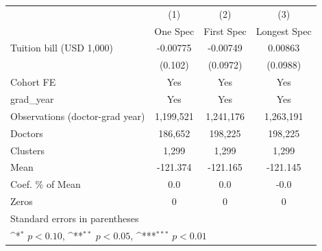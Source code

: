 {
\def\sym#1{\ifmmode^{#1}\else\(^{#1}\)\fi}
\begin{tabular}{l*{3}{c}}
\hline\hline
                    &\multicolumn{1}{c}{(1)}&\multicolumn{1}{c}{(2)}&\multicolumn{1}{c}{(3)}\\
                    &\multicolumn{1}{c}{One Spec}&\multicolumn{1}{c}{First Spec}&\multicolumn{1}{c}{Longest Spec}\\
\hline
Tuition bill (USD 1,000)&    -0.00775         &    -0.00749         &     0.00863         \\
                    &     (0.102)         &    (0.0972)         &    (0.0988)         \\
[1em]
Cohort FE           &         Yes         &         Yes         &         Yes         \\
[1em]
grad\_year           &         Yes         &         Yes         &         Yes         \\
\hline
Observations (doctor-grad year)&   1,199,521         &   1,241,176         &   1,263,191         \\
Doctors             &     186,652         &     198,225         &     198,225         \\
Clusters            &       1,299         &       1,299         &       1,299         \\
Mean                &    -121.374         &    -121.165         &    -121.145         \\
Coef. \% of Mean    &         0.0         &         0.0         &        -0.0         \\
Zeros               &           0         &           0         &           0         \\
\hline\hline
\multicolumn{4}{l}{\footnotesize Standard errors in parentheses}\\
\multicolumn{4}{l}{\footnotesize \sym{*} \(p<0.10\), \sym{**} \(p<0.05\), \sym{***} \(p<0.01\)}\\
\end{tabular}
}

